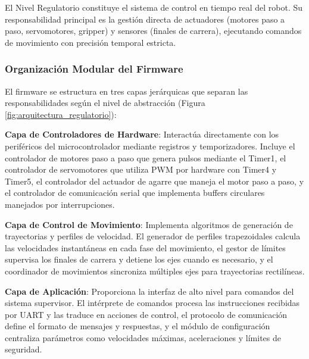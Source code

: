 El Nivel Regulatorio constituye el sistema de control en tiempo real del robot. Su responsabilidad principal es la gestión directa de actuadores (motores paso a paso, servomotores, gripper) y sensores (finales de carrera), ejecutando comandos de movimiento con precisión temporal estricta.

\subsubsection{Organización Modular del Firmware}

El firmware se estructura en tres capas jerárquicas que separan las responsabilidades según el nivel de abstracción (Figura \ref{fig:arquitectura_regulatorio}):

\textbf{Capa de Controladores de Hardware}: Interactúa directamente con los periféricos del microcontrolador mediante registros y temporizadores. Incluye el controlador de motores paso a paso que genera pulsos mediante el Timer1, el controlador de servomotores que utiliza PWM por hardware con Timer4 y Timer5, el controlador del actuador de agarre que maneja el motor paso a paso, y el controlador de comunicación serial que implementa buffers circulares manejados por interrupciones.

\textbf{Capa de Control de Movimiento}: Implementa algoritmos de generación de trayectorias y perfiles de velocidad. El generador de perfiles trapezoidales calcula las velocidades instantáneas en cada fase del movimiento, el gestor de límites supervisa los finales de carrera y detiene los ejes cuando es necesario, y el coordinador de movimientos sincroniza múltiples ejes para trayectorias rectilíneas.

\textbf{Capa de Aplicación}: Proporciona la interfaz de alto nivel para comandos del sistema supervisor. El intérprete de comandos procesa las instrucciones recibidas por UART y las traduce en acciones de control, el protocolo de comunicación define el formato de mensajes y respuestas, y el módulo de configuración centraliza parámetros como velocidades máximas, aceleraciones y límites de seguridad.

